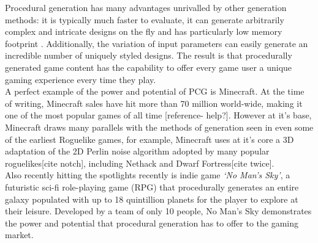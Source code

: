 \documentclass[12pt,a4paper]{article}
\begin{document}


Procedural generation has many advantages unrivalled by other generation methods: it is typically much faster to evaluate, it can generate arbitrarily complex and intricate designs on the fly and has particularly low memory footprint \cite{surveyPNF}. Additionally, the variation of input parameters can easily generate an incredible number of uniquely styled designs. The result is that procedurally generated game content has the capability to offer every game user a unique gaming experience every time they play. \\


A perfect example of the power and potential of PCG is Minecraft. At the time of writing, Minecraft sales have hit more than 70 million world-wide, making it one of the most popular games of all time [reference- help?]. However at it's base, Minecraft draws many parallels with the methods of generation seen in even some of the earliest Roguelike games, for example, Minecraft uses at it's core a 3D adaptation of the 2D Perlin noise algorithm adopted by many popular roguelikes[cite notch], including Nethack and Dwarf Fortress[cite twice].\\

Also recently hitting the spotlights recently is indie game \emph{`No Man's Sky'}, a futuristic sci-fi role-playing game (RPG) that procedurally generates an entire galaxy populated with up to 18 quintillion planets for the player to explore at their leisure. Developed by a team of only 10 people, No Man's Sky demonstrates the power and potential that procedural generation has to offer to the gaming market. \\
\end{document}
